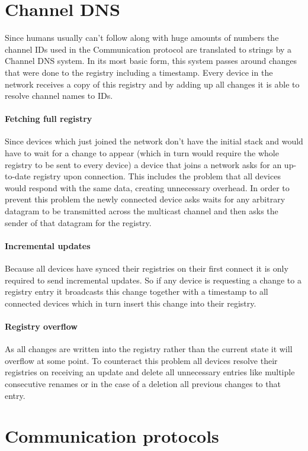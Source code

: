 \documentclass[a4paper]{article}
\begin{document}
	\section{Channel DNS}
	    Since humans usually can't follow along with huge amounts of numbers the channel IDs used in the Communication
	    protocol are translated to strings by a Channel DNS system. In its most basic form, this system passes around
	    changes that were done to the registry including a timestamp. Every device in the network receives a
	    copy of this registry and by adding up all changes it is able to resolve channel names to IDs.
	    \paragraph{Fetching full registry} Since devices which just joined the network don't have the initial stack and
	        would have to wait for a change to appear (which in turn would require the whole registry to be sent to
	        every device) a device that joins a network asks for an up-to-date registry upon connection. This
	        includes the problem that all devices would respond with the same data, creating unnecessary overhead. In
	        order to prevent this problem the newly connected device asks waits for any arbitrary datagram to be
	        transmitted across the multicast channel and then asks the sender of that datagram for the registry.
        \paragraph{Incremental updates}  Because all devices have synced their registries on their first connect it is
            only required to send incremental updates. So if any device is requesting a change to a registry entry it
            broadcasts this change together with a timestamp to all connected devices which in turn insert this change
            into their registry.
        \paragraph{Registry overflow} As all changes are written into the registry rather than the current state it will
            overflow at some point. To counteract this problem all devices resolve their registries on receiving an
            update and delete all unnecessary entries like multiple consecutive renames or in the case of a deletion all
            previous changes to that entry.
    \section{Communication protocols}
\end{document}
